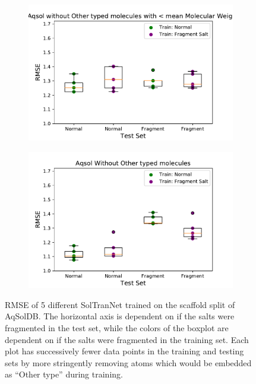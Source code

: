 \documentclass[journal=jmcmar,manuscript=article]{achemso}
\begin{document}
\begin{figure}[tb]
    \begin{subfigure}[t]{0.48\textwidth}
        \centering
        \includegraphics[width=\linewidth]{figures/othersMW_saltfragfirst_RMSEs_boxplots.pdf}
    \end{subfigure}%
    \hfill
    \begin{subfigure}[t]{0.48\textwidth}
        \centering
        \includegraphics[width=\linewidth]{figures/noothers_saltfragfirst_RMSEs_boxplots.pdf}
    \end{subfigure}
    \caption{RMSE of 5 different SolTranNet trained on the scaffold split of AqSolDB. The horizontal axis is dependent on if the salts were fragmented in the test set, while the colors of the boxplot are dependent on if the salts were fragmented in the training set. Each plot has successively fewer data points in the training and testing sets by more stringently removing atoms which would be embedded as ``Other type'' during training.}
    \label{fig:saltfragrmse}
\end{figure}
\end{document}
